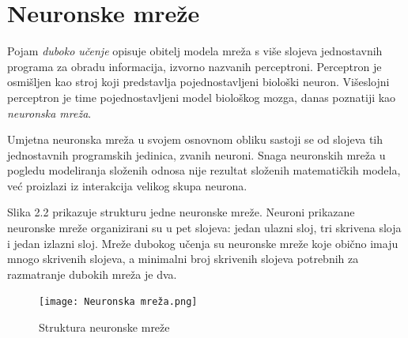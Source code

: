 \documentclass[times, utf8, diplomski]{fer}
\begin{document}
\break




\section{Neuronske mreže}
Pojam \textit{duboko učenje} opisuje obitelj modela mreža s više slojeva jednostavnih programa za obradu informacija, izvorno nazvanih perceptroni. Perceptron je osmišljen kao stroj koji predstavlja pojednostavljeni biološki neuron. Višeslojni perceptron je time pojednostavljeni model biološkog mozga, danas poznatiji kao \textit{neuronska mreža}. \cite{perceptron}

Umjetna neuronska mreža u svojem osnovnom obliku sastoji se od slojeva tih jednostavnih programskih jedinica, zvanih neuroni. Snaga neuronskih mreža u pogledu modeliranja složenih odnosa nije rezultat složenih matematičkih modela, već proizlazi iz interakcija velikog skupa neurona. \cite{knjiga}

Slika 2.2 prikazuje strukturu jedne neuronske mreže. Neuroni prikazane neuronske mreže organizirani su u pet slojeva: jedan ulazni sloj, tri skrivena sloja i jedan izlazni sloj. Mreže dubokog učenja su neuronske mreže koje obično imaju mnogo skrivenih slojeva, a minimalni broj skrivenih slojeva potrebnih za razmatranje dubokih mreža je dva. \cite{knjiga} \\

\begin{figure}[h]
\centering
\texttt{[image: Neuronska mreža.png]}
\caption{Struktura neuronske mreže}
\end{figure}
\end{document}
